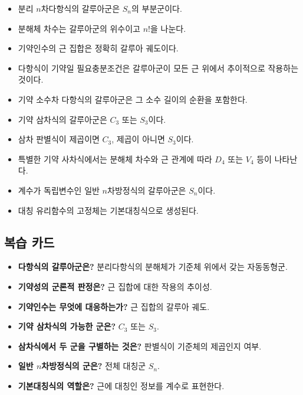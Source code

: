 \begin{chapterreview}
\begin{itemize}
  \item 분리 $n$차다항식의 갈루아군은 $S_n$의 부분군이다.
  \item 분해체 차수는 갈루아군의 위수이고 $n!$을 나눈다.
  \item 기약인수의 근 집합은 정확히 갈루아 궤도이다.
  \item 다항식이 기약일 필요충분조건은 갈루아군이 모든 근 위에서 추이적으로 작용하는 것이다.
  \item 기약 소수차 다항식의 갈루아군은 그 소수 길이의 순환을 포함한다.
  \item 기약 삼차식의 갈루아군은 $C_3$ 또는 $S_3$이다.
  \item 삼차 판별식이 제곱이면 $C_3$, 제곱이 아니면 $S_3$이다.
  \item 특별한 기약 사차식에서는 분해체 차수와 근 관계에 따라 $D_4$ 또는 $V_4$ 등이 나타난다.
  \item 계수가 독립변수인 일반 $n$차방정식의 갈루아군은 $S_n$이다.
  \item 대칭 유리함수의 고정체는 기본대칭식으로 생성된다.
\end{itemize}
\end{chapterreview}

\subsection*{복습 카드}

\begin{itemize}
  \item \textbf{다항식의 갈루아군은?} 분리다항식의 분해체가 기준체 위에서 갖는 자동동형군.
  \item \textbf{기약성의 군론적 판정은?} 근 집합에 대한 작용의 추이성.
  \item \textbf{기약인수는 무엇에 대응하는가?} 근 집합의 갈루아 궤도.
  \item \textbf{기약 삼차식의 가능한 군은?} $C_3$ 또는 $S_3$.
  \item \textbf{삼차식에서 두 군을 구별하는 것은?} 판별식이 기준체의 제곱인지 여부.
  \item \textbf{일반 $n$차방정식의 군은?} 전체 대칭군 $S_n$.
  \item \textbf{기본대칭식의 역할은?} 근에 대칭인 정보를 계수로 표현한다.
\end{itemize}
